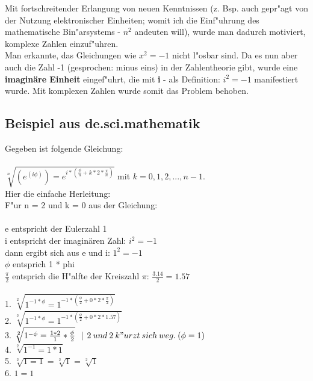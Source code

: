 \documentclass[10pt]{book}
\begin{document}
\begin{itemize}
    Mit fortschreitender Erlangung von neuen Kenntnissen (z. Bsp. auch gepr"agt
    von der Nutzung elektronischer Einheiten; womit ich
    die Einf"uhrung des mathematische Bin"arsystems - $n^2$ andeuten will), wurde man
    dadurch motiviert, komplexe Zahlen einzuf"uhren.\\
    Man erkannte, das Gleichungen wie $x^2 = -1$ nicht l"osbar sind.
    Da es nun aber auch die Zahl -1 (gesprochen: minus eins) in der
    Zahlentheorie gibt, wurde eine \textbf{imaginäre Einheit} eingef"uhrt, die mit \textbf{i}
    - als Definition: \textbf{ $ i^2 = -1 $ }  manifestiert wurde.
    Mit komplexen Zahlen wurde somit das Problem behoben.
\end{itemize}
\subsection{Beispiel aus de.sci.mathematik}

Gegeben ist folgende Gleichung: \\ \\
$\sqrt[n]{(e^{(i \phi)}) = e^{i * (\frac{\phi}{n} + k * 2 * \frac{\pi}{n})} } $ mit  $ k = 0, 1, 2,..., n-1. $ \\

Hier die einfache Herleitung: \\
F"ur n = 2 und k = 0 aus der Gleichung: \\
\\
e entspricht der Eulerzahl 1 \\
i entspricht der imaginären Zahl: \: $ i^2 = -1 $ \\
dann ergibt sich aus e und i: \: $ 1^2 = -1 $ \\
$ \phi $ entsprich 1 * phi \\
$ \frac{\pi}{2} $ entsprich die H"alfte der Kreiszahl $\pi $: $ \frac{3.14}{2} = 1.57 $ \\
\\
1. $ \sqrt[2]{1^{-1 * \phi} = 1^{-1 * (\frac{\phi}{2} + 0 * 2 * \frac{\pi}{2})}} $ \\
2. $ \sqrt[2]{1^{-1 * \phi} = 1^{-1 * (\frac{\phi}{2} + 0 * 2 * 1.57)}} $ \\
3. $ \sqrt[2]{1^{-\phi} = \frac{1 * 2}{1} * \frac{\phi}{2}}  \: \: \: | \: \: 2 \: und \: 2 \: k"urzt \: sich \: weg. \: (\phi = 1)$\\
4. $ \sqrt[2]{1^{-1} = 1 * 1} $ \\
5. $ \sqrt[2]{1 = 1} = \sqrt[2]{1} = \sqrt[2]{1} $ \\
6. $ 1 = 1 $
\end{document}
